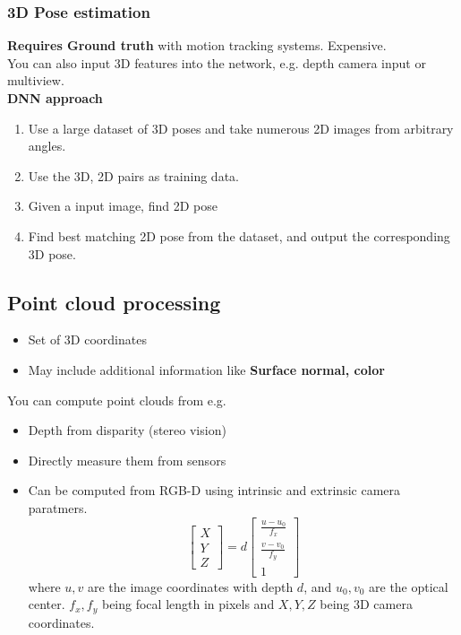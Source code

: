 \documentclass[a4paper]{article}
\begin{document}
\subsubsection*{3D Pose estimation}
\textbf{Requires Ground truth} with motion tracking systems. Expensive. \\

You can also input 3D features into the network, e.g. depth camera input or multiview. \\


\textbf{DNN approach} 
\begin{enumerate}
	\item Use a large dataset of 3D poses and take numerous 2D images from arbitrary angles. 
	\item Use the 3D, 2D pairs as training data.
	\item Given a input image, find 2D pose
	\item Find best matching 2D pose from the dataset, and output the corresponding 3D pose.
\end{enumerate}


\newpage
\subsection{Point cloud processing}
\begin{itemize}
	\item Set of 3D coordinates
	\item May include additional information like \textbf{Surface normal, color} 
\end{itemize}

You can compute point clouds from e.g. 
\begin{itemize}
	\item Depth from disparity (stereo vision)
	\item Directly measure them from sensors
	\item Can be computed from RGB-D using intrinsic and extrinsic camera paratmers. 
		\begin{equation}
		\begin{bmatrix}
		X \\
		Y \\
		Z
		\end{bmatrix} = d \begin{bmatrix}
		\frac{u - u_0}{f_x}  \\
		\frac{v-v_0}{f_y} \\
		1
		\end{bmatrix} 
		\end{equation}
		where $ u,v $ are the image coordinates with depth $ d $, and $ u_0,v_0 $ are the optical center. $ f_x, f_y $ being focal length in pixels and  $ X,Y,Z $ being 3D camera coordinates.

\end{itemize}
\end{document}
